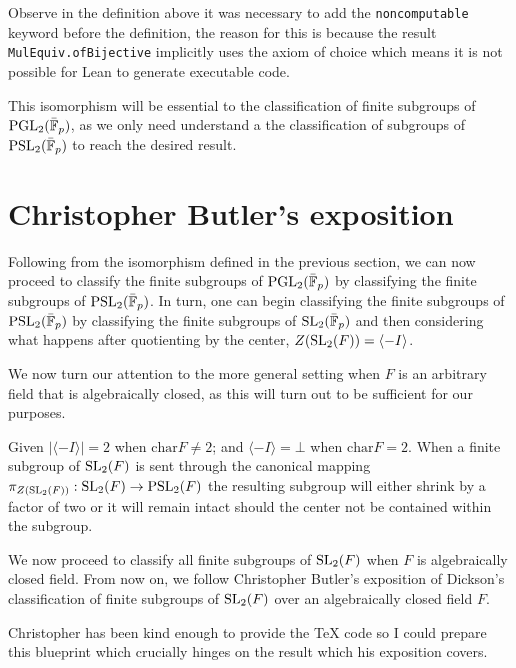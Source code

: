 \begin{remark}[Noncomputable]
    Observe in the definition above it was necessary to add the \texttt{noncomputable} keyword before the definition, the reason for this is
    because the result \texttt{MulEquiv.ofBijective} implicitly uses the axiom of choice which means it is not possible for Lean to generate
    executable code.
\end{remark}




This isomorphism will be essential to the classification of finite subgroups of $\operatorname{PGL}_2(\bar{\mathbb{F}}_p)$, as we only need understand a the classification of subgroups of $\operatorname{PSL}_2(\bar{\mathbb{F}}_p)$ to reach the desired result.


\section{Christopher Butler's exposition}

Following from the isomorphism defined in the previous section, we can now proceed to classify the finite subgroups of $\operatorname{PGL}_2(\bar{\mathbb{F}}_p)$ by classifying the finite subgroups of $\operatorname{PSL}_2(\bar{\mathbb{F}}_p)$. 
In turn, one can begin classifying the finite subgroups of $\operatorname{PSL}_2(\bar{\mathbb{F}}_p)$ by classifying the finite subgroups of $\operatorname{SL}_2(\bar{\mathbb{F}}_p)$ and then considering what happens after
quotienting by the center, $Z(\operatorname{SL}_2(F)) = \langle -I\rangle$.

We now turn our attention to the more general setting when $F$ is an arbitrary field that is algebraically closed, as this will turn out to be sufficient for our purposes.

Given $|\langle -I \rangle| = 2$ when $\textrm{char} F \ne 2$; and $\langle -I\rangle = \bot$ when $\textrm{char} F = 2$.
When a finite subgroup of $\operatorname{SL}_2(F)$ is sent through the canonical mapping $\pi_{Z(\operatorname{SL}_2(F))} : \operatorname{SL}_2(F) \rightarrow \operatorname{PSL}_2(F)$ 
the resulting subgroup will either shrink by a factor of two or it will remain intact should the center not be contained within the subgroup. 

We now proceed to classify all finite subgroups of $\operatorname{SL}_2(F)$ when $F$ is algebraically closed field. 
From now on, we follow Christopher Butler's exposition of Dickson's classification of finite subgroups of $\operatorname{SL}_2(F)$ over an algebraically closed field $F$. 

Christopher has been kind enough to provide the TeX code so I could prepare this blueprint which crucially hinges on the result which his exposition \cite{butler} covers.